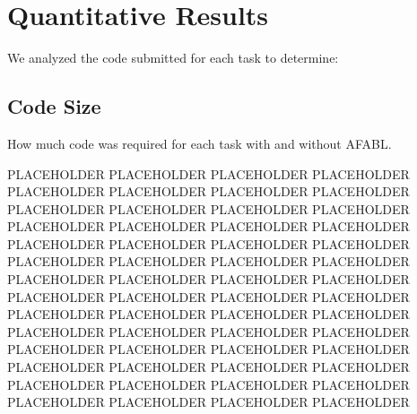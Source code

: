 






\section{Quantitative Results}

We analyzed the code submitted for each task to determine:

\subsection{Code Size}

How much code was required for each task with and without AFABL.

PLACEHOLDER PLACEHOLDER PLACEHOLDER PLACEHOLDER PLACEHOLDER PLACEHOLDER PLACEHOLDER PLACEHOLDER PLACEHOLDER PLACEHOLDER PLACEHOLDER PLACEHOLDER PLACEHOLDER PLACEHOLDER PLACEHOLDER PLACEHOLDER PLACEHOLDER PLACEHOLDER PLACEHOLDER PLACEHOLDER PLACEHOLDER PLACEHOLDER PLACEHOLDER PLACEHOLDER PLACEHOLDER PLACEHOLDER PLACEHOLDER PLACEHOLDER PLACEHOLDER PLACEHOLDER PLACEHOLDER PLACEHOLDER PLACEHOLDER PLACEHOLDER PLACEHOLDER PLACEHOLDER PLACEHOLDER PLACEHOLDER PLACEHOLDER PLACEHOLDER PLACEHOLDER PLACEHOLDER PLACEHOLDER PLACEHOLDER PLACEHOLDER PLACEHOLDER PLACEHOLDER PLACEHOLDER PLACEHOLDER PLACEHOLDER PLACEHOLDER PLACEHOLDER PLACEHOLDER PLACEHOLDER PLACEHOLDER PLACEHOLDER


